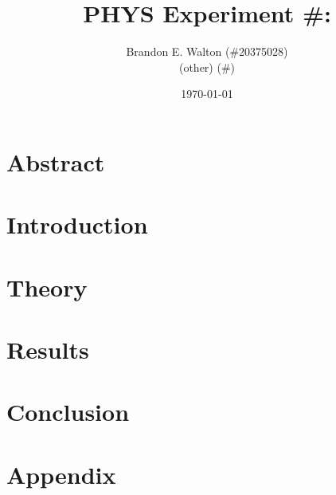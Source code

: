 \documentclass{article}
\title{PHYS  Experiment \#: }
\author{Brandon E. Walton (\#20375028)\\ (other) (\#)}
\date{\today}
\begin{document}
\maketitle
\thispagestyle{empty}
\pagebreak

\section*{Abstract}

\pagebreak

\setlength{\parskip}{6pt}
\section{Introduction}

\pagebreak

\section{Theory}

\pagebreak

\section{Results}

\pagebreak

\section{Conclusion}

\pagebreak

\section{Appendix}

\end{document}
